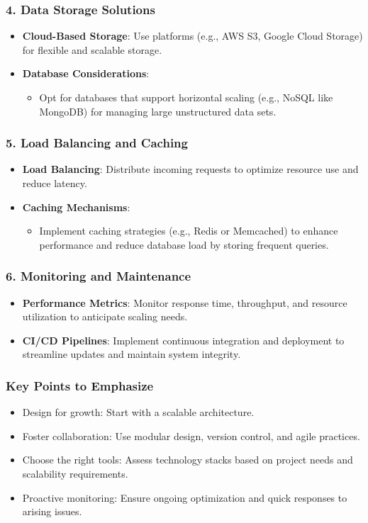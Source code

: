 \documentclass{beamer}
\begin{document}
\begin{frame}[fragile]
    \frametitle{4. Data Storage Solutions}
    \begin{itemize}
        \item \textbf{Cloud-Based Storage}: Use platforms (e.g., AWS S3, Google Cloud Storage) for flexible and scalable storage.
        \item \textbf{Database Considerations}:
            \begin{itemize}
                \item Opt for databases that support horizontal scaling (e.g., NoSQL like MongoDB) for managing large unstructured data sets.
            \end{itemize}
    \end{itemize}
\end{frame}

\begin{frame}[fragile]
    \frametitle{5. Load Balancing and Caching}
    \begin{itemize}
        \item \textbf{Load Balancing}: Distribute incoming requests to optimize resource use and reduce latency.
        \item \textbf{Caching Mechanisms}: 
            \begin{itemize}
                \item Implement caching strategies (e.g., Redis or Memcached) to enhance performance and reduce database load by storing frequent queries.
            \end{itemize}
    \end{itemize}
\end{frame}

\begin{frame}[fragile]
    \frametitle{6. Monitoring and Maintenance}
    \begin{itemize}
        \item \textbf{Performance Metrics}: Monitor response time, throughput, and resource utilization to anticipate scaling needs.
        \item \textbf{CI/CD Pipelines}: Implement continuous integration and deployment to streamline updates and maintain system integrity.
    \end{itemize}
\end{frame}

\begin{frame}[fragile]
    \frametitle{Key Points to Emphasize}
    \begin{itemize}
        \item Design for growth: Start with a scalable architecture.
        \item Foster collaboration: Use modular design, version control, and agile practices.
        \item Choose the right tools: Assess technology stacks based on project needs and scalability requirements.
        \item Proactive monitoring: Ensure ongoing optimization and quick responses to arising issues.
    \end{itemize}
\end{frame}
\end{document}
